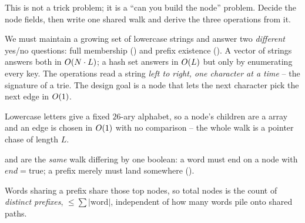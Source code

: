 \begin{attemptgate}
This is not a trick problem; it is a ``can you build the node'' problem. Decide the node fields, then
write one shared walk and derive the three operations from it.
\end{attemptgate}

We must maintain a growing set of lowercase strings and answer two \emph{different} yes/no questions: full
membership () and prefix existence (). A vector of strings answers both in
$O(N\cdot L)$; a hash set answers  in $O(L)$ but  only by enumerating
every key. The operations read a string \emph{left to right, one character at a time} -- the signature of
a trie. The design goal is a node that lets the next character pick the next edge in $O(1)$.

\begin{observation}
Lowercase letters give a fixed $26$-ary alphabet, so a node's children are a  array and an
edge is chosen in $O(1)$ with no comparison -- the whole walk is a pointer chase of length $L$.
\end{observation}
\begin{observation}
 and  are the \emph{same} walk differing by one boolean: a word must end on
a node with $\mathit{end}=\text{true}$; a prefix merely must land somewhere ().
\end{observation}
\begin{observation}
Words sharing a prefix share those top nodes, so total nodes is the count of \emph{distinct prefixes},
$\le\sum|{\text{word}}|$, independent of how many words pile onto shared paths.
\end{observation}

